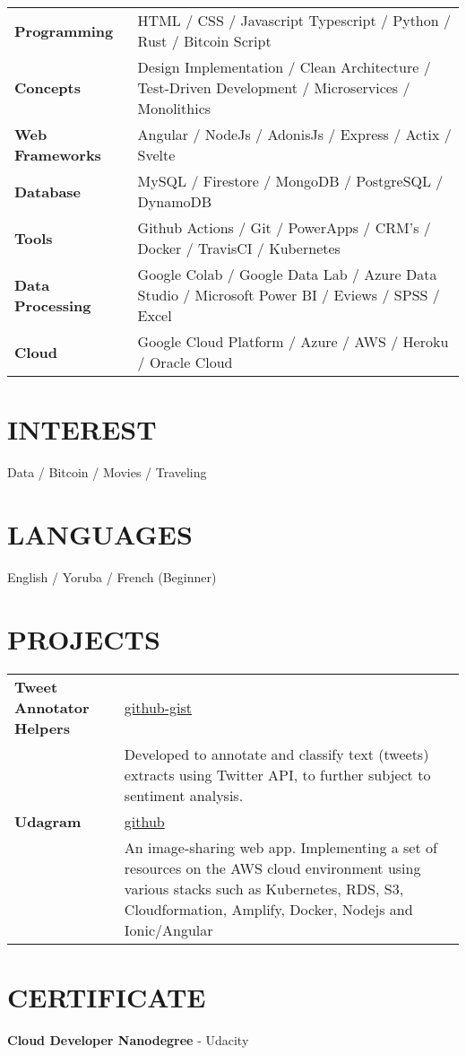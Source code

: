 \documentclass[a4paper,12pt]{article}
\begin{document}
\begin{tabularx}{\linewidth}{@{}l X@{}}
\textbf{Programming} & HTML / CSS / Javascript Typescript / Python / Rust / Bitcoin Script \\
\textbf{Concepts} & Design Implementation / Clean Architecture / Test-Driven Development / Microservices / Monolithics \\
\textbf{Web Frameworks} & Angular / NodeJs / AdonisJs / Express / Actix / Svelte \\
\textbf{Database} & MySQL / Firestore / MongoDB / PostgreSQL / DynamoDB \\
\textbf{Tools} & Github Actions / Git / PowerApps / CRM's / Docker / TravisCI / Kubernetes \\
\textbf{Data Processing} & Google Colab / Google Data Lab / Azure Data Studio / Microsoft Power BI / Eviews / SPSS / Excel \\
\textbf{Cloud} & Google Cloud Platform / Azure / AWS / Heroku / Oracle Cloud
\end{tabularx}

\section{INTEREST}
Data / Bitcoin / Movies / Traveling

\section{LANGUAGES}
English / Yoruba / French (Beginner)

\section{PROJECTS}

\begin{tabularx}{\linewidth}{@{}l X@{}}
\textbf{Tweet Annotator Helpers} & \hfill \href{https://github-gist.com}{github-gist} \\
& Developed to annotate and classify text (tweets) extracts using Twitter API, to further subject to sentiment analysis. \\[10pt]
\textbf{Udagram} & \hfill \href{https://github.com}{github} \\
& An image-sharing web app. Implementing a set of resources on the AWS cloud environment using various stacks such as Kubernetes, RDS, S3, Cloudformation, Amplify, Docker, Nodejs and Ionic/Angular
\end{tabularx}

\section{CERTIFICATE}
\textbf{Cloud Developer Nanodegree} - Udacity

\vfill
{}
\end{document}
